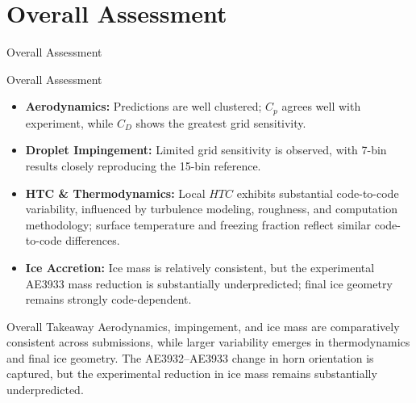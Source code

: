 
\section[Overview]{\textbf{Overall Assessment}}


\begin{frame}{\small Overall Assessment}
\scriptsize

\begin{block}{\scriptsize Overall Assessment}
\begin{itemize}
    \item \textbf{Aerodynamics:} Predictions are well clustered; $C_p$ agrees well with experiment, while $C_D$ shows the greatest grid sensitivity.

    \item \textbf{Droplet Impingement:} Limited grid sensitivity is observed, with 7-bin results closely reproducing the 15-bin reference.

    \item \textbf{HTC \& Thermodynamics:} Local $HTC$ exhibits substantial code-to-code variability, influenced by turbulence modeling, roughness, and computation methodology; surface temperature and freezing fraction reflect similar code-to-code differences.

    \item \textbf{Ice Accretion:} Ice mass is relatively consistent, but the experimental AE3933 mass reduction is substantially underpredicted; final ice geometry remains strongly code-dependent.
\end{itemize}
\end{block}

\vspace{0.15cm}

\begin{alertblock}{\scriptsize Overall Takeaway}
Aerodynamics, impingement, and ice mass are comparatively consistent across submissions, while larger variability emerges in thermodynamics and final ice geometry. The AE3932--AE3933 change in horn orientation is captured, but the experimental reduction in ice mass remains substantially underpredicted.
\end{alertblock}

\end{frame}